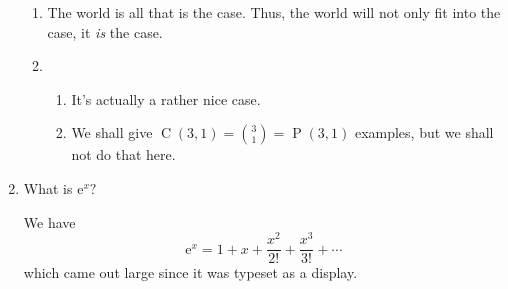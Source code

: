\documentclass[12pt]{amsart}
\DeclareMathOperator{\perm}{P}
\DeclareMathOperator{\comb}{C}
\newcommand{\e}{\mathrm{e}}
\begin{document}
\begin{enumerate}
  \begin{enumerate}
  \item   The world is all that is the case.  Thus, the world will not
    only fit into the case, it \emph{is} the case.
  \item
    \begin{enumerate}
    \item It's actually a rather nice case.
    \item We shall give $\comb(3,1) = \binom{3}{1} = \perm(3,1)$
      examples, but we shall not do that here.
    \end{enumerate}
  \end{enumerate}

\item What is $\e^{x}?$

\bigskip

We have
\begin{displaymath}
  \e^{x} = 1 + x + \frac{x^{2}}{2!} + \frac{x^{3}}{3!} + \cdots
\end{displaymath}
which came out large since it was typeset as a display.

\end{enumerate}
\end{document}
